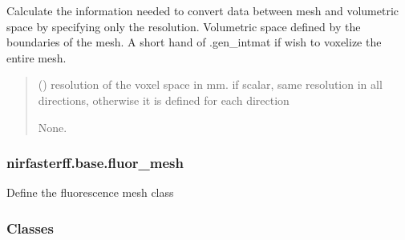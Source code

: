 \documentclass[letterpaper,10pt,english]{sphinxmanual}
\begin{document}
\begin{fulllineitems}
\begin{fulllineitems}
\label{\detokenize{_autosummary/nirfasterff.base.dcs_mesh.dcsmesh:nirfasterff.base.dcs_mesh.dcsmesh.voxelize}}
\pysigstartsignatures
\pysiglinewithargsret
{}
{}
{}
\pysigstopsignatures
\sphinxAtStartPar
Calculate the information needed to convert data between mesh and volumetric space by specifying only the resolution.
Volumetric space defined by the boundaries of the mesh. A short hand of .gen\_intmat if wish to voxelize the entire mesh.
\begin{quote}\begin{description}
\sphinxAtStartPar
{} () \textendash{} resolution of the voxel space in mm.
if scalar, same resolution in all directions, otherwise it is defined for each direction

\sphinxAtStartPar
None.

\end{description}\end{quote}

\end{fulllineitems}


\end{fulllineitems}


\sphinxstepscope


\subsubsection{nirfasterff.base.fluor\_mesh}
\label{\detokenize{_autosummary/nirfasterff.base.fluor_mesh:module-nirfasterff.base.fluor_mesh}}\label{\detokenize{_autosummary/nirfasterff.base.fluor_mesh:nirfasterff-base-fluor-mesh}}\label{\detokenize{_autosummary/nirfasterff.base.fluor_mesh::doc}}
\sphinxAtStartPar
Define the fluorescence mesh class
\subsubsection*{Classes}
\end{document}
